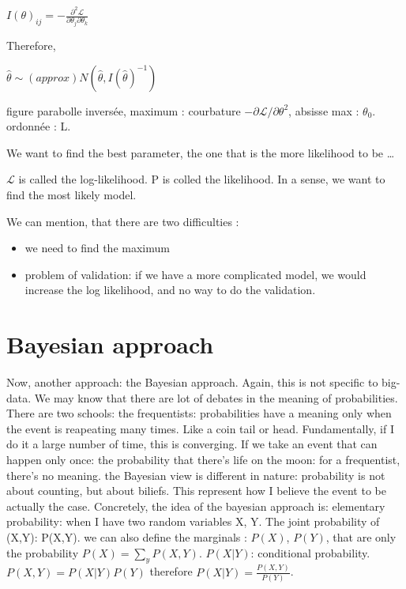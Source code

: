 $I(\theta)_{ij} = - \frac{\partial^2 \mathcal{L}}{\partial \theta_j \partial\theta_k}$

Therefore,

$\hat\theta \sim (approx) N(\hat\theta, I(\hat\theta)^{-1})$

\begin{marginfigure}
\TODO
figure parabolle inversée, maximum : courbature $-\partial\mathcal L/\partial \theta^2$, absisse max : $\theta_0$. ordonnée : L.
\end{marginfigure}

We want to find the best parameter, \ie the one that is the more likelihood to be \ldots

$\mathcal{L}$ is called the log-likelihood. P is colled the likelihood.
In a sense, we want to find the most likely model.

We can mention, that there are two difficulties :
\begin{itemize}
\item we need to find the maximum
\item problem of validation: if we have a more complicated model, we would increase
the log likelihood, and no way to do the validation.
\end{itemize}

\section{Bayesian approach}

Now, another approach: the Bayesian approach. Again, this is not specific to big-data.
We may know that there are lot of debates in the meaning of probabilities. There
are two schools: the frequentists: probabilities have a meaning only when the
event is reapeating many times. Like a coin tail or head. Fundamentally, if I do
it a large number of time, this is converging.
If we take an event that can happen only once: the probability that there's life
on the moon: for a frequentist, there's no meaning.
the Bayesian view is different in nature: probability is not about counting, but
about biliefs. This represent how I believe the event to be actually the case.
Concretely, the idea of the bayesian approach is:
elementary probability: when I have two random variables X, Y.
The joint probability of (X,Y): P(X,Y). we can also define the marginals :
$P(X)$, $P(Y)$, that are only the probability $P(X) = \sum_y P(X,Y)$.
$P(X|Y)$: conditional probability.
$P(X,Y) = P(X|Y)P(Y)$
therefore $P(X|Y) = \frac{P(X,Y)}{P(Y)}$.


